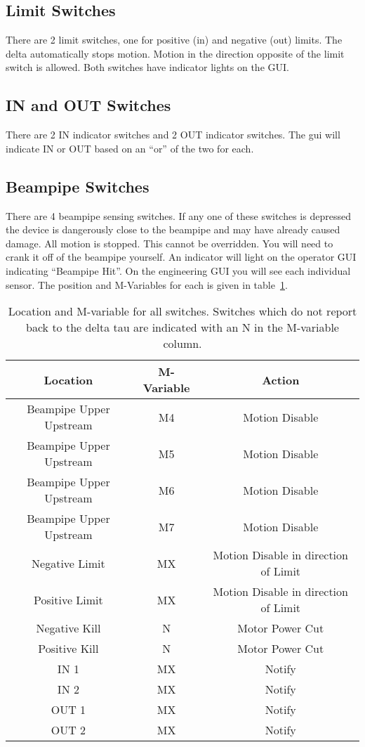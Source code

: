 \documentclass[12pt,letterpaper]{article}
\begin{document}
\subsection{Limit Switches}
There are 2 limit switches, one for positive (in) and negative (out) limits.  The delta automatically stops motion.  Motion in the direction opposite of the limit switch is allowed.  Both switches have indicator lights on the GUI.

\subsection{IN and OUT Switches}
There are 2 IN indicator switches and 2 OUT indicator switches.  The gui will indicate IN or OUT based on an ``or'' of the two for each.

\subsection{Beampipe Switches}
There are 4 beampipe sensing switches.  If any one of these switches is depressed the device is dangerously close to the beampipe and may have already caused damage.  All motion is stopped.  This cannot be overridden.  You will need to crank it off of the beampipe yourself.  An indicator will light on the operator GUI indicating ``Beampipe Hit''.  On the engineering GUI you will see each individual sensor.  The position and M-Variables for each is given in table~\ref{tbl:switches}.



\begin{table}
\begin{center}
\begin{tabular}{|c|c|c|}
\hline
Location & M-Variable & Action\\\hline
Beampipe Upper Upstream & M4 & Motion Disable \\
Beampipe Upper Upstream & M5 & Motion Disable \\
Beampipe Upper Upstream & M6 & Motion Disable \\
Beampipe Upper Upstream & M7 & Motion Disable \\
Negative Limit          & MX & Motion Disable in direction of Limit\\
Positive Limit          & MX & Motion Disable in direction of Limit\\
Negative Kill           & N  & Motor Power Cut\\
Positive Kill           & N  & Motor Power Cut\\
IN 1                    & MX & Notify\\
IN 2                    & MX & Notify\\
OUT 1                   & MX & Notify\\
OUT 2                   & MX & Notify\\
\hline
\end{tabular}
\caption{Location and M-variable for all switches.  Switches which do not report back to the delta tau are indicated with an N in the M-variable column.}
\label{tbl:switches}
\end{center}
\end{table}
\end{document}
